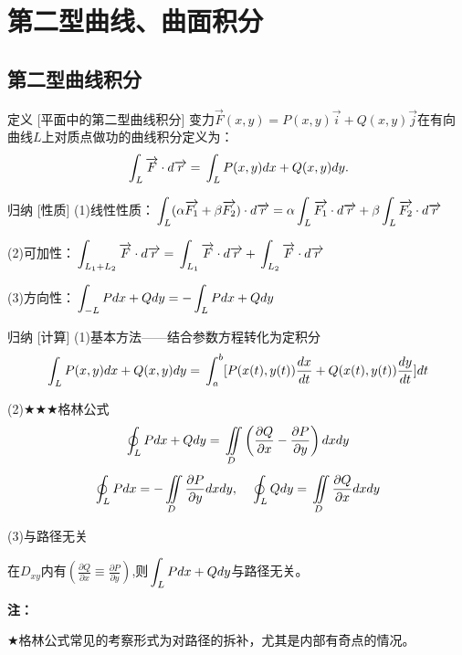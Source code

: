 \documentclass[a4paper,12pt,oneside,fontset=none]{ctexbook}
\let\oldint\int
\renewcommand{\int}{\displaystyle{\vrule width 0pt height 0em depth 0em}\oldint}
\let\oldiint\iint
\renewcommand{\iint}{\displaystyle{\vrule width 0pt height 0em depth 0em}\oldiint}
\let\oldoint\oint
\renewcommand{\oint}{\displaystyle{\vrule width 0pt height 1.5em depth 1.5em}\oldoint}
\newenvironment{induction}[1][]{\begin{thmBox}{归纳}{#1}}{\end{thmBox}}
\newcounter{definition}[chapter]
\newenvironment{definition}[1][]{\begin{defBox}{定义}{#1}}{\end{defBox}}
\newenvironment{note}{
    \par\vspace{0.5em}\noindent
    \textbf{\color{NoteColor} 注：}
}{
    \par\vspace{0.5em}
}
\numberwithin{equation}{chapter}
\begin{document}
\section{第二型曲线、曲面积分}
\subsection{第二型曲线积分}
\begin{definition}
    [平面中的第二型曲线积分]
    变力$\overrightarrow{F}(x,y) = P(x,y)\overrightarrow{i} + Q(x,y)\overrightarrow{j}$在有向曲线$L$上对质点做功的曲线积分定义为：
    $$\int_L \overrightarrow{F} \cdot d\overrightarrow{r} = \int_L P(x,y)dx + Q(x,y)dy.$$
\end{definition}
\begin{induction}
    [性质]
    (1)线性性质：$\int_L (\alpha \overrightarrow{F_1} + \beta \overrightarrow{F_2}) \cdot d\overrightarrow{r} = \alpha \int_L \overrightarrow{F_1} \cdot d\overrightarrow{r} + \beta \int_L \overrightarrow{F_2} \cdot d\overrightarrow{r}$

    (2)可加性：$\int_{L_1+L_2} \overrightarrow{F} \cdot d\overrightarrow{r} = \int_{L_1} \overrightarrow{F} \cdot d\overrightarrow{r} + \int_{L_2} \overrightarrow{F} \cdot d\overrightarrow{r}$

    (3)方向性：$\int_{-L} Pdx + Qdy = -\int_L Pdx + Qdy$
\end{induction}
\begin{induction}
    [计算]
    (1)基本方法——结合参数方程转化为定积分
    $$\int_L P(x,y)dx + Q(x,y)dy = \int_a^b [P(x(t),y(t))\frac{dx}{dt} + Q(x(t),y(t))\frac{dy}{dt}] dt$$
    
    (2)$\bigstar\bigstar\bigstar$格林公式
    $$\oint_{L} Pdx + Qdy = \iint\limits_{D} \left(\frac{\partial Q}{\partial x} - \frac{\partial P}{\partial y}\right) dxdy$$
    $$\oint_{L} Pdx = -\iint\limits_{D} \frac{\partial P}{\partial y} dxdy,\quad \oint_{L} Qdy = \iint\limits_{D} \frac{\partial Q}{\partial x} dxdy$$
    
    (3)与路径无关

    在$D_{xy}$内有$\left(\frac{\partial Q}{\partial x} \equiv  \frac{\partial P}{\partial y}\right)$,则$\int_L Pdx + Qdy$与路径无关。
\end{induction}
\begin{note}
    $\bigstar$格林公式常见的考察形式为对路径的拆补，尤其是内部有奇点的情况。
\end{note}
\end{document}
